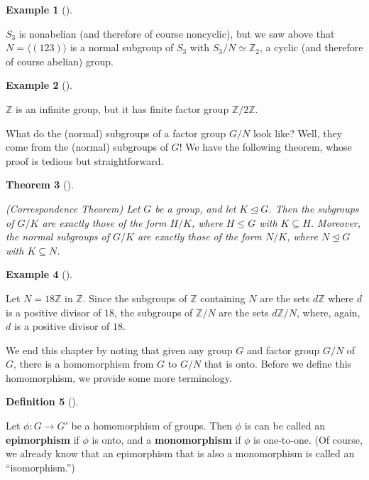 \documentclass[10pt,]{book}
\newcommand{\terminology}[1]{\textbf{#1}}
\theoremstyle{plain}
\newtheorem{theorem}{Theorem}[section]
\theoremstyle{definition}
\newtheorem{definition}[theorem]{Definition}
\theoremstyle{definition}
\theoremstyle{definition}
\newtheorem{example}[theorem]{Example}
\theoremstyle{definition}
\numberwithin{equation}{section}
\def\Z{\mathbb{Z}}
\begin{document}
\begin{example}[]\label{example-85}

        \(S_3\) is nonabelian (and therefore of course noncyclic), but we
        saw above that \(N=\langle (123)\rangle\) is a normal subgroup of \(S_3\) with
        \(S_3/N \simeq \Z_2\), a cyclic (and therefore of course abelian)
        group.
\end{example}
\begin{example}[]\label{example-86}

        \(\Z\) is an infinite group, but it has finite factor group
        \(\Z/2\Z\).
\end{example}
\par

    What do the (normal) subgroups of a factor group \(G/N\) look like?
    Well, they come from the (normal) subgroups of \(G\)! We have the
    following theorem, whose proof is tedious but straightforward.
\begin{theorem}[{}]\label{theorem-54}

        {\emph{(Correspondence Theorem)}} Let \(G\) be a
        group, and let \(K\unlhd G\). Then the subgroups of \(G/K\) are exactly
        those of the form \(H/K\), where \(H\leq G\) with \(K\subseteq H\).
        Moreover, the normal subgroups of \(G/K\) are exactly those of the
        form \(N/K\), where \(N\unlhd G\) with \(K\subseteq N\).
\end{theorem}
\begin{example}[]\label{example-87}

        Let \(N=18\Z\) in \(\Z\). Since the subgroups of \(\Z\) containing \(N\)
        are the sets \(d\Z\) where \(d\) is a positive divisor of \(18\), the
        subgroups of \(\Z/N\) are the sets \(d\Z/N\), where, again, \(d\) is a
        positive divisor of \(18\).
\end{example}
\par

    We end this chapter by noting that given any group \(G\) and
    factor group \(G/N\) of \(G\), there is a homomorphism from \(G\) to \(G/N\)
    that is onto. Before we define this homomorphism, we provide some
    more terminology.
\begin{definition}[{}]\label{definition-68}

        Let \(\phi: G\to G'\) be a homomorphism of groups. Then
        \(\phi\) is can be called an \terminology{epimorphism} if \(\phi\) is onto,
        and a \terminology{monomorphism} if \(\phi\) is one-to-one. (Of course,
        we already know that an epimorphism that is also a monomorphism
        is called an ``isomorphism.'')
\end{definition}
\par
\end{document}
